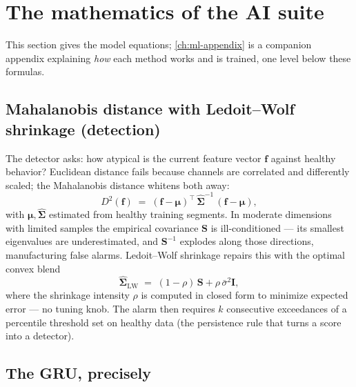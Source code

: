 \section{The mathematics of the AI suite}
\label{sec:ai-math}

This section gives the model equations; \cref{ch:ml-appendix} is a companion appendix
explaining \emph{how} each method works and is trained, one level below these formulas.

\subsection{Mahalanobis distance with Ledoit--Wolf shrinkage (detection)}
\label{sec:math-maha}

The detector asks: how atypical is the current feature vector $\mathbf{f}$ against healthy
behavior? Euclidean distance fails because channels are correlated and differently scaled;
the Mahalanobis distance whitens both away:
\begin{equation}
  D^2(\mathbf{f}) \;=\; (\mathbf{f} - \boldsymbol{\mu})^{\!\top}\,
  \hat{\boldsymbol{\Sigma}}^{-1}\,(\mathbf{f} - \boldsymbol{\mu}),
  \label{eq:mahalanobis}
\end{equation}
with $\boldsymbol{\mu}, \hat{\boldsymbol{\Sigma}}$ estimated from healthy training
segments. In moderate dimensions with limited samples the empirical covariance
$\mathbf{S}$ is ill-conditioned --- its smallest eigenvalues are underestimated, and
$\mathbf{S}^{-1}$ explodes along those directions, manufacturing false alarms. Ledoit--Wolf
shrinkage repairs this with the optimal convex blend
\begin{equation}
  \hat{\boldsymbol{\Sigma}}_{\mathrm{LW}} \;=\; (1-\rho)\,\mathbf{S} + \rho\,\bar{\sigma}^2 \mathbf{I},
  \label{eq:ledoitwolf}
\end{equation}
where the shrinkage intensity $\rho$ is computed in closed form to minimize expected error
--- no tuning knob. The alarm then requires $k$ consecutive exceedances of a percentile
threshold set on healthy data (the persistence rule that turns a score into a detector).

\subsection{The GRU, precisely}
\label{sec:math-gru}

